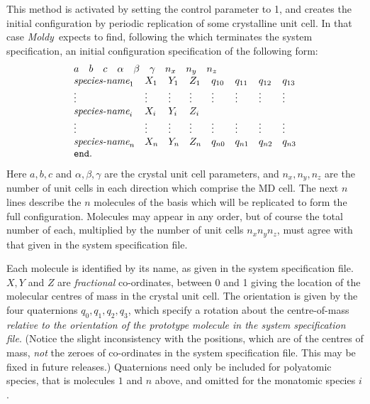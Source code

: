 \documentclass[a4paper,twoside]{report}
\newcommand{\moldy}{\emph{Moldy}}
\begin{document}
This method is activated by setting the control parameter
 to 1, and creates the initial configuration by
periodic replication of some crystalline unit cell.  In that case
\moldy\  expects to find, following the  which terminates the
system specification, an initial configuration specification of the
following form:
\begin{displaymath}
\begin{array}{llllllll}
\multicolumn{8}{l}{a \quad b \quad c \quad \alpha \quad \beta \quad
  \gamma \quad n_{x} \quad n_{y} \quad n_{z}} \\ 
\textit{species-name}_{1} &
X_{1} & Y_{1} & Z_{1} &  q_{10} & q_{11} & q_{12} & q_{13} \\
\vdots &  \vdots & \vdots & \vdots & \vdots & \vdots & \vdots & \vdots \\
\textit{species-name}_{i} & X_{i} & Y_{i} & Z_{i} \\
\vdots &  \vdots & \vdots & \vdots & \vdots & \vdots & \vdots & \vdots \\
\textit{species-name}_{n} &
X_{n} & Y_{n} & Z_{n} &  q_{n0} & q_{n1} & q_{n2} & q_{n3}  \\
\Lit{end}. \\
\end{array}
\end{displaymath}
Here $a, b, c$ and $\alpha, \beta, \gamma$ are the crystal unit cell
parameters, and $n_{x}, n_{y}, n_{z}$ are the number of unit cells in
each direction which comprise the MD cell.  The next $n$ lines
describe the $n$ molecules of the basis which will be replicated to
form the full configuration.  Molecules may appear in any order, but
of course the total number of each, multiplied by the number of unit
cells $n_{x} n_{y} n_{z}$, must agree with that given in the system
specification file.

Each molecule is identified by its name, as given in the system
specification file.  $X, Y$ and $Z$ are \emph{fractional}
co-ordinates, between 0 and 1 giving the location of the molecular
centres of mass in the crystal unit cell. The orientation is given by
the four quaternions $q_{0}, q_{1}, q_{2}, q_{3}$, which specify a
rotation about the centre-of-mass \emph{relative to the orientation of
  the prototype molecule in the system specification file}.  (Notice
the slight inconsistency with the positions, which are of the centres
of mass, \emph{not} the zeroes of co-ordinates in the system
specification file. This may be fixed in future releases.)
Quaternions need only be included for polyatomic species, that is
molecules $1$ and $n$ above, and omitted for the monatomic species
$i$.
\end{document}
